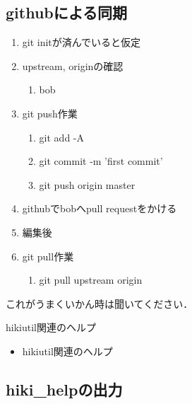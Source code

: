 \subsection{githubによる同期}\begin{enumerate}
\item git initが済んでいると仮定
\item upstream, originの確認\begin{enumerate}
\item bob%
\end{enumerate}
\item git push作業\begin{enumerate}
\item git add -A
\item git commit -m 'first commit'
\item git push origin master
\end{enumerate}
\item githubでbobへpull requestをかける
\item 編集後
\item git pull作業\begin{enumerate}
\item git pull upstream origin
\end{enumerate}
\end{enumerate}
これがうまくいかん時は聞いてください．

hikiutil関連のヘルプ
\begin{itemize}
\item hikiutil関連のヘルプ
\end{itemize}
\subsection{hiki\_helpの出力}
